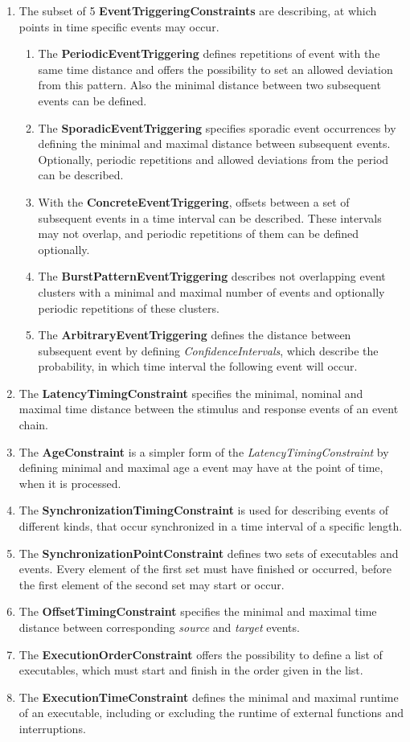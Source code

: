 	\begin{enumerate}
		\item
			The subset of 5 \textbf{EventTriggeringConstraints} are describing, at which points in time specific events may occur.
			\begin{enumerate}[1]
				\item
					The \textbf{PeriodicEventTriggering} defines repetitions of event with the same time distance and offers the possibility to set an allowed deviation from this pattern. Also the minimal distance between two subsequent events can be defined.
				\item
					The \textbf{SporadicEventTriggering} specifies sporadic event occurrences by defining the minimal and maximal distance between subsequent events. Optionally, periodic repetitions and allowed deviations from the period can be described.
				\item
					With the \textbf{ConcreteEventTriggering}, offsets between a set of subsequent events in a time interval can be described. These intervals may not overlap, and periodic repetitions of them can be defined optionally.
				\item
					The \textbf{BurstPatternEventTriggering} describes not overlapping event clusters with a minimal and maximal number of events and optionally periodic repetitions of these clusters.
				\item
					The \textbf{ArbitraryEventTriggering} defines the distance between subsequent event by defining \emph{ConfidenceIntervals}, which describe the probability, in which time interval the following event will occur.
			\end{enumerate}
		\item
			The \textbf{LatencyTimingConstraint} specifies the minimal, nominal and maximal time distance between the stimulus and response events of an event chain.
		\item
			The \textbf{AgeConstraint} is a simpler form of the \emph{LatencyTimingConstraint} by defining minimal and maximal age a event may have at the point of time, when it is processed.
		\item
			The \textbf{SynchronizationTimingConstraint} is used for describing events of different kinds, that occur synchronized in a time interval of a specific length.
		\item
			The \textbf{SynchronizationPointConstraint} defines two sets of executables and events. Every element of the first set must have finished or occurred, before the first element of the second set may start or occur.
		\item
			The \textbf{OffsetTimingConstraint} specifies the minimal and maximal time distance between corresponding \emph{source} and \emph{target} events.
		\item
			The \textbf{ExecutionOrderConstraint} offers the possibility to define a list of executables, which must start and finish in the order given in the list.
		\item
			The \textbf{ExecutionTimeConstraint} defines the minimal and maximal runtime of an executable, including or excluding the runtime of external functions and interruptions.
	\end{enumerate}

